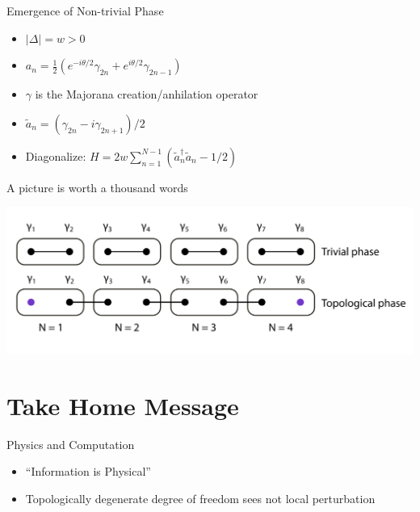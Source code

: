 \documentclass[presentation]{beamer}
\begin{document}
\begin{frame}[label={sec:org0d1330a}]{Emergence of Non-trivial Phase \cite{huangIntroductionMajoranaZero2021}}
\begin{itemize}
\item \(|\Delta| = w > 0\)
\item \(a_{n} = \frac{1}{2}(e^{-i \theta /2}\gamma_{2n} +
  e^{i\theta/2}\gamma_{2n-1})\)
\item \(\gamma\) is the Majorana creation/anhilation operator
\item \(\tilde{a}_{n} = (\gamma_{2n}-i\gamma_{2n+1})/2\)
\item \alert{Diagonalize}: \(H = 2w \sum_{n=1}^{N-1}(\tilde{a}^{\dagger}_{n}\tilde{a}_{n} -1/2)\)
\end{itemize}
\end{frame}

\begin{frame}[label={sec:orgb9a864b}]{A picture is worth a thousand words}
\begin{center}
\includegraphics[width=.9\linewidth]{./two-phases.png}
\end{center}
\end{frame}


\section{Take Home Message}
\label{sec:org28e5c75}
\begin{frame}[label={sec:orgb56f5bc}]{Physics and Computation}
\begin{itemize}
\item ``Information is Physical'' \cite{landauerThereAreNo1991}
\item Topologically degenerate degree of freedom sees not local perturbation
\end{itemize}
\end{frame}
\end{document}
